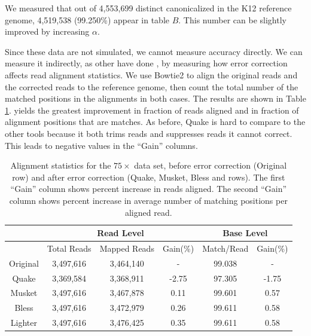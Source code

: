 \documentclass[10pt]{article}
\begin{document}
We measured that out of 4,553,699 distinct canonicalized \kmers in the \ecoli K12 reference genome, 4,519,538 (99.250\%) appear in table $B$.  This number can be slightly improved by increasing $\alpha$. 
 
Since these data are not simulated, we cannot measure accuracy directly.  We can measure it indirectly, as other have done \cite{heo2014bless}, by measuring how error correction affects read alignment statistics.  We use Bowtie2 \cite{langmead2012fast} to align the original reads and the corrected reads to the reference genome, then count the total number of the matched positions in the alignments in both cases.  The results are shown in Table \ref{table:ecoli_alignment}.  \tool yields the greatest improvement in fraction of reads aligned and in fraction of alignment positions that are matches.  As before, Quake is hard to compare to the other tools because it both trims reads and suppresses reads it cannot correct.  This leads to negative values in the ``Gain'' columns.

\begin{table}
\centering
\begin{tabular}{|c|c|c|c||c|c|} \hline
	 & \multicolumn{3}{|c||}{Read Level} & \multicolumn{2}{|c|}{Base Level} \\ \hline
     & Total Reads 	& Mapped Reads & Gain(\%) & Match/Read & Gain(\%) \\ \hline
Original & 3,497,616 & 	3,464,140	 & - & 99.038	& - \\ \hline
Quake	& 3,369,584	& 3,368,911	& -2.75	& 97.305	& -1.75  \\ \hline
Musket	& 3,497,616	& 3,467,878	& 0.11	& 99.601	& 0.57  \\ \hline
Bless	& 3,497,616	& 3,472,979	& 0.26	& 99.611	& 0.58  \\ \hline
Lighter	 & 3,497,616	&  3,476,425	& 0.35	& 99.611	& 0.58  \\ \hline
\end{tabular}
\caption{Alignment statistics for the $75\times$ \ecoli data set, before error correction (Original row) and after error correction (Quake, Musket, Bless and \tool rows).  The first ``Gain'' column shows percent increase in reads aligned.  The second ``Gain'' column shows percent increase in average number of matching positions per aligned read.\label{table:ecoli_alignment}}
\end{table}

\end{document}
